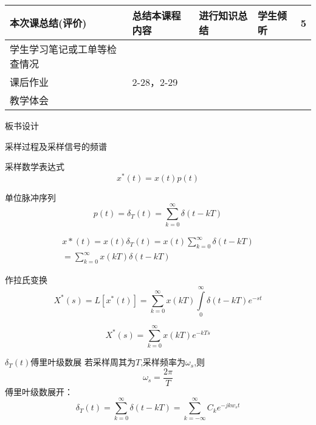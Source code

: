 {\begin{landscape}
\begin{longtable}{|m{10mm}|m{50mm}|m{50mm}|m{50mm}|m{15mm}|}
\centering 本次课总结(评价)&总结本课程内容 &进行知识总结 &学生倾听 &5 \\\hline
\centering 学生学习笔记或工单等检查情况&\multicolumn{4}{m{165mm}|}{\quad}\\\hline
\centering 课后作业&\multicolumn{4}{m{165mm}|}{2-28，2-29}\\\hline
\centering 教学体会&\multicolumn{4}{m{165mm}|}{\quad}\\
\end{longtable}

\end{landscape}
\clearpage
\begin{center}
{\huge 板书设计}
\end{center}
}

 \begin{frame}{采样过程及采样信号的频谱} 
 \begin{block}{采样数学表达式}
\[x^*(t)=x(t)p(t)\]
 \end{block}
 \begin{block}{单位脉冲序列}
 \[p(t)=\delta_T(t)=\sum\limits_{k=0}^\infty\delta(t-kT)\]
 \end{block}
 \end{frame}
 
 \begin{frame}
 \begin{block}{}
\begin{eqnarray*}
x*(t)=x(t)\delta_T(t)=x(t)\sum\limits_{k=0}^\infty\delta(t-kT)\\
=\sum\limits_{k=0}^\infty x(kT)\delta(t-kT)
\end{eqnarray*}
\end{block}
\end{frame}

\begin{frame}
\begin{block}{作拉氏变换}
\[X^*(s)=L[x^*(t)]=\sum\limits_{k=0}^\infty x(kT)\int\limits_0^\infty\delta(t-kT)e^{-st}\]

\[X^*(s)=\sum\limits_{k=0}^\infty x(kT)e^{-kTs}\]
\end{block}
\end{frame}

\begin{frame}
\begin{block}{$\delta_T(t)$傅里叶级数展}
若采样周其为$T$,采样频率为$\omega_s$,则
\[\omega_s=\frac{2\pi}{T}\]
傅里叶级数展开：
\begin{equation*}
\delta_T(t)=\sum\limits_{k=0}^\infty\delta(t-kT)=\sum\limits_{k=-\infty}^\infty C_k e^{-jkw_st}
\end{equation*}
\end{block}
\end{frame}

